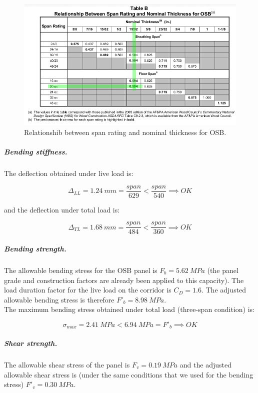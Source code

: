 \begin{figure}
  \begin{center}
    \includegraphics[width=120mm]{figures/osb_nominal_thickness.png}
  \end{center}
  \caption{Relationshib between span rating and nominal thickness for OSB.}\label{fg_osb_nominal_thickness}
\end{figure}

\subparagraph{Bending stiffness.}
The deflection obtained under live load is:

\begin{equation}
  \Delta_{LL}= 1.24\ mm= \frac{span}{629} < \frac{span}{540} \implies OK
\end{equation}

\noindent and the deflection under total load is:

\begin{equation}
  \Delta_{TL}= 1.68\ mm= \frac{span}{484} < \frac{span}{360} \implies OK
\end{equation}

\subparagraph{Bending strength.}
The allowable bending stress for the OSB panel is $F_b= 5.62\ MPa$ (the panel grade and construction factors are already been applied to this capacity). The load duration factor for the live load on the corridor is $C_D= 1.6$. The adjusted allowable bending stress is therefore $F'_b= 8.98\ MPa$.\\

The maximum bending stress obtained under total load (three-span condition) is:

\begin{equation}
  \sigma_{max}= 2.41\ MPa < 6.94\ MPa = F'_b \implies OK
\end{equation}


\subparagraph{Shear strength.}
The allowable shear stress of the panel is $F_v= 0.19\ MPa$ and the adjusted allowable shear stress is (under the same conditions that we used for the bending stress) $F'_v= 0.30\ MPa$.\\

